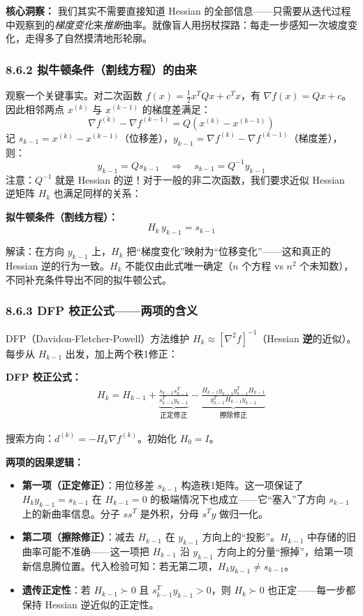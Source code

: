 \textbf{核心洞察：} 我们其实不需要直接知道 Hessian 的全部信息——只需要从迭代过程中观察到的\emph{梯度变化}来\emph{推断}曲率。就像盲人用拐杖探路：每走一步感知一次坡度变化，走得多了自然摸清地形轮廓。

\subsubsection{8.6.2 拟牛顿条件（割线方程）的由来}

观察一个关键事实。对二次函数 $f(x) = \tfrac{1}{2}x^T Q x + c^T x$，有 $\nabla f(x) = Qx + c$。因此相邻两点 $x^{(k)}$ 与 $x^{(k-1)}$ 的梯度差满足：
\[
\nabla f^{(k)} - \nabla f^{(k-1)} = Q(x^{(k)} - x^{(k-1)})
\]
记 $s_{k-1} = x^{(k)} - x^{(k-1)}$（位移差），$y_{k-1} = \nabla f^{(k)} - \nabla f^{(k-1)}$（梯度差），则：
\[
y_{k-1} = Q s_{k-1}\quad\Longrightarrow\quad s_{k-1} = Q^{-1} y_{k-1}
\]
注意：$Q^{-1}$ 就是 Hessian 的逆！对于一般的非二次函数，我们要求近似 Hessian 逆矩阵 $H_k$ 也满足同样的关系：

\textbf{拟牛顿条件（割线方程）：}
\[
\boxed{H_k\, y_{k-1} = s_{k-1}}
\]

解读：在方向 $y_{k-1}$ 上，$H_k$ 把“梯度变化”映射为“位移变化”——这和真正的 Hessian 逆的行为一致。$H_k$ 不能仅由此式唯一确定（$n$ 个方程 vs $n^2$ 个未知数），不同补充条件导出不同的拟牛顿公式。

\subsubsection{8.6.3 DFP 校正公式——两项的含义}

DFP（Davidon-Fletcher-Powell）方法维护 $H_k \approx [\nabla^2 f]^{-1}$（Hessian \textbf{逆}的近似）。每步从 $H_{k-1}$ 出发，加上两个秩1修正：

\textbf{DFP 校正公式：}
\begin{multline*}
H_k = H_{k-1}
      + \underbrace{\frac{s_{k-1} s_{k-1}^T}{s_{k-1}^T y_{k-1}}}_{\text{正定修正}}
      - \underbrace{\frac{H_{k-1} y_{k-1} y_{k-1}^T H_{k-1}}{y_{k-1}^T H_{k-1} y_{k-1}}}_{\text{擦除修正}}
\end{multline*}

搜索方向：$d^{(k)} = -H_k \nabla f^{(k)}$。初始化 $H_0 = I$。

\textbf{两项的因果逻辑：}
\begin{itemize}
  \item \textbf{第一项（正定修正）}：用位移差 $s_{k-1}$ 构造秩1矩阵。这一项保证了 $H_k y_{k-1} = s_{k-1}$ 在 $H_{k-1}=0$ 的极端情况下也成立——它“塞入”了方向 $s_{k-1}$ 上的新曲率信息。分子 $ss^T$ 是外积，分母 $s^Ty$ 做归一化。
  \item \textbf{第二项（擦除修正）}：减去 $H_{k-1}$ 在 $y_{k-1}$ 方向上的“投影”。$H_{k-1}$ 中存储的旧曲率可能不准确——这一项把 $H_{k-1}$ 沿 $y_{k-1}$ 方向上的分量“擦掉”，给第一项新信息腾位置。代入检验可知：若无第二项，$H_k y_{k-1} \neq s_{k-1}$。
  \item \textbf{遗传正定性}：若 $H_{k-1} \succ 0$ 且 $s_{k-1}^T y_{k-1} > 0$，则 $H_k \succ 0$ 也正定——每一步都保持 Hessian 逆近似的正定性。
\end{itemize}

